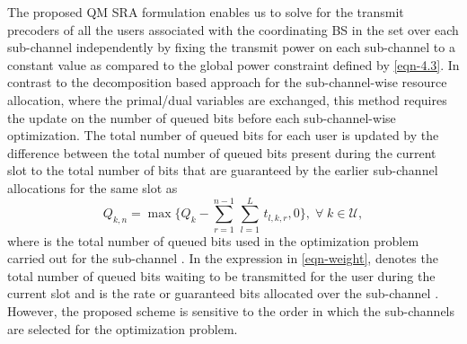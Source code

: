 The proposed \acl{QM} \ac{SRA} formulation enables us to solve for the transmit precoders of all the users associated with the coordinating \ac{BS} in the set  over each sub-channel independently by fixing the transmit power on each sub-channel to a constant value  as compared to the global power constraint defined by \eqref{eqn-4.3}. In contrast to the decomposition based approach for the sub-channel-wise resource allocation, where the primal/dual variables are exchanged, this method requires the update on the number of queued bits before each sub-channel-wise optimization. The total number of queued bits for each user is updated by the difference between the total number of queued bits present during the current slot to the total number of bits that are guaranteed by the earlier sub-channel allocations for the same slot as
\begin{equation}
Q_{k,n} = \max{\Big \lbrace Q_k - \sum_{r = 1}^{n-1} \, \sum_{l = 1}^{L} \, t_{l,k,r} ,0 \Big \rbrace }, \; \forall \; k \in \mathcal{U},
\label{eqn-weight}
\end{equation}
where  is the total number of queued bits used in the optimization problem carried out for the sub-channel . In the expression in \eqref{eqn-weight},  denotes the total number of queued bits waiting to be transmitted for the user  during the current slot and  is the rate or guaranteed bits allocated over the sub-channel . However, the proposed scheme is sensitive to the order in which the sub-channels are selected for the optimization problem. 
%
